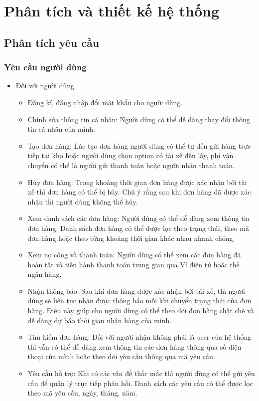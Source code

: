 \chapter{Phân tích và thiết kế hệ thống}

\section{Phân tích yêu cầu}
    \subsection{Yêu cầu người dùng}
    	\begin{itemize}
				\item Đối với người dùng
					\begin{itemize}
				        \item Đăng kí, đăng nhập đổi mật khẩu cho người dùng.
				        \item Chỉnh sửa thông tin cá nhân: Người dùng có thể dễ dàng thay đổi thông tin cá nhân của mình.
				        \item Tạo đơn hàng: Lúc tạo đơn hàng người dùng có thể tự đến gửi hàng trực tiếp tại kho hoặc người dùng chọn option có tài xế đến lấy, phí vận chuyển có thể là người gửi thanh toán hoặc người nhận thanh toán.
				        \item Hủy đơn hàng: Trong khoảng thời gian đơn hàng được xác nhận bởi tài xế thì đơn hàng có thể bị hủy. Chú ý rằng sau khi đơn hàng đã được xác nhận thì người dùng không thể hủy.
				        \item Xem danh sách các đơn hàng: Người dùng có thể dễ dàng xem thông tin đơn hàng. Danh sách đơn hàng có thể được lọc theo trạng thái, theo mã đơn hàng hoặc theo từng khoảng thời gian khác nhau nhanh chóng.
				        \item Xem nợ công và thanh toán: Người dùng có thể xem các đơn hàng đã hoàn tất và tiến hành thanh toán trung gian qua Ví điện tử hoăc thẻ ngân hàng.
				        \item Nhận thông báo: Sau khi đơn hàng được xác nhận bởi tài xế, thì ngươi dùng sẽ liên tục nhận được thông báo mỗi khi chuyển trạng thái của đơn hàng. Điều này giúp cho người dùng có thể theo dõi đơn hàng chặt chẽ và dễ dàng dự báo thời gian nhận hàng của mình.
				        \item Tìm kiếm đơn hàng: Đối với người nhận không phải là user của hệ thống thì vẫn có thể dễ dàng xem thông tin các đơn hàng thông qua số điện thoại của mình hoặc theo dõi yêu cầu thông qua mã yêu cầu.
				        \item Yêu cầu hỗ trợ: Khi có các vấn đề thắc mắc thì người dùng có thể gửi yêu cầu để quản lý trực tiếp phản hồi. Danh sách các yêu cầu có thể được lọc theo mã yêu cầu, ngày, tháng, năm.
				        

\end{itemize}
\end{itemize}
